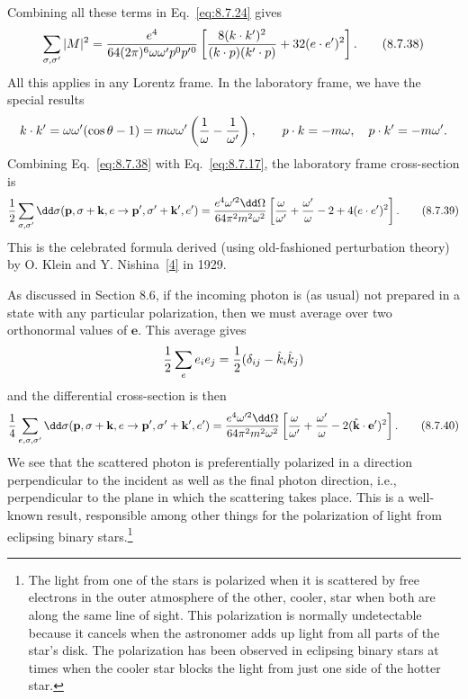 Combining all these terms in Eq.~\eqref{eq:8.7.24} gives
\begin{equation}
\sum_{\sigma,\sigma'}|M|^2
={e^4\over64(2\pi)^6\omega\omega'p^0p'{}^0}
\left[{8(k\cdot k')^2\over(k\cdot p)(k'\cdot p)}+32(e\cdot e')^2\right].
\tag{8.7.38}\label{eq:8.7.38}
\end{equation}
All this applies in any Lorentz frame. In the laboratory frame, we have the
special results
\[
k\cdot k'=\omega\omega'(\cos\theta-1)
=m\omega\omega'\left({1\over\omega}-{1\over\omega'}\right),
\qquad p\cdot k=-m\omega,\quad p\cdot k'=-m\omega'.
\]
Combining Eq.~\eqref{eq:8.7.38} with Eq.~\eqref{eq:8.7.17}, the laboratory frame cross-section
is
\begin{align}
{1\over2}\sum_{\sigma,\sigma'}\dd\sigma(\mathbf p,\sigma+\mathbf k,e
\to\mathbf p',\sigma'+\mathbf k',e')
={e^4\omega'^2\dd\Omega\over64\pi^2m^2\omega^2}
\left[{\omega\over\omega'}+{\omega'\over\omega}-2+4(e\cdot e')^2\right].
\tag{8.7.39}\label{eq:8.7.39}
\end{align}
This is the celebrated formula derived (using old-fashioned perturbation
theory) by O. Klein and Y. Nishina~\hyperref[ref:8.4]{[4]} in 1929.

As discussed in Section 8.6, if the incoming photon is (as usual) not prepared
in a state with any particular polarization, then we must average over two
orthonormal values of $\mathbf e$. This average gives
\[
{1\over2}\sum_e e_i e_j={1\over2}(\delta_{ij}-\hat k_i\hat k_j)
\]
and the differential cross-section is then
\begin{equation}
{1\over4}\sum_{e,\sigma,\sigma'}\dd\sigma(\mathbf p,\sigma+\mathbf k,e
\to\mathbf p',\sigma'+\mathbf k',e')
={e^4\omega'^2\dd\Omega\over64\pi^2m^2\omega^2}
\left[{\omega\over\omega'}+{\omega'\over\omega}
-2(\hat{\mathbf k}\cdot\mathbf e')^2\right].
\tag{8.7.40}\label{eq:8.7.40}
\end{equation}
We see that the scattered photon is preferentially polarized in a direction
perpendicular to the incident as well as the final photon direction, i.e.,
perpendicular to the plane in which the scattering takes place. This is a
well-known result, responsible among other things for the polarization of
light from eclipsing binary stars.\footnote{The light from one of the stars
is polarized when it is scattered by free electrons in the outer atmosphere
of the other, cooler, star when both are along the same line of sight. This
polarization is normally undetectable because it cancels when the astronomer
adds up light from all parts of the star's disk. The polarization has been
observed in eclipsing binary stars at times when the cooler star blocks the
light from just one side of the hotter star.}

